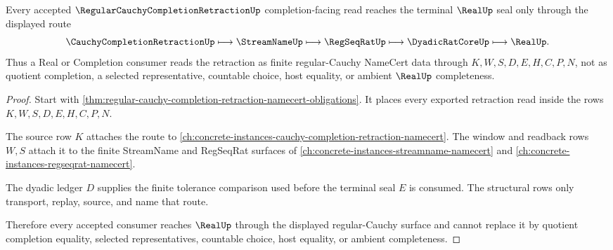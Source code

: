 \begin{theorem}
\label{thm:regular-cauchy-completion-retraction-real-seal-route}
Every accepted $\RegularCauchyCompletionRetractionUp$ completion-facing read reaches the terminal $\RealUp$ seal only through the displayed route
$$
\CauchyCompletionRetractionUp \longmapsto \StreamNameUp \longmapsto \RegSeqRatUp \longmapsto \DyadicRatCoreUp \longmapsto \RealUp .
$$
Thus a Real or Completion consumer reads the retraction as finite regular-Cauchy NameCert data through $K,W,S,D,E,H,C,P,N$, not as quotient completion, a selected representative, countable choice, host equality, or ambient $\RealUp$ completeness.
\end{theorem}
\begin{proof}
Start with \autoref{thm:regular-cauchy-completion-retraction-namecert-obligations}. It places every exported retraction read inside the rows $K,W,S,D,E,H,C,P,N$.

The source row $K$ attaches the route to \autoref{ch:concrete-instances-cauchy-completion-retraction-namecert}. The window and readback rows $W,S$ attach it to the finite StreamName and RegSeqRat surfaces of \autoref{ch:concrete-instances-streamname-namecert} and \autoref{ch:concrete-instances-regseqrat-namecert}.

The dyadic ledger $D$ supplies the finite tolerance comparison used before the terminal seal $E$ is consumed. The structural rows only transport, replay, source, and name that route.

Therefore every accepted consumer reaches $\RealUp$ through the displayed regular-Cauchy surface and cannot replace it by quotient completion equality, selected representatives, countable choice, host equality, or ambient completeness.
\end{proof}




